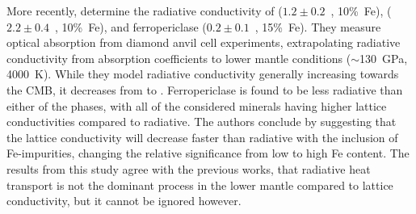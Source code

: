 More recently, \citet{Lobanov2017} determine the radiative conductivity of \ppvs ($1.2\pm0.2$~\wmk, 10\%~Fe), \bdgs ($2.2\pm0.4$~\wmk, 10\%~Fe), and ferropericlase ($0.2\pm0.1$~\wmk, 15\%~Fe). They measure optical absorption from diamond anvil cell experiments, extrapolating radiative conductivity from absorption coefficients to lower mantle conditions ($\sim$130~GPa, 4000~K). While they model radiative conductivity generally increasing towards the CMB, it decreases from \bdgs to \ppv. Ferropericlase is found to be less radiative than either of the \mgfesios phases, with all of the considered minerals having higher lattice conductivities compared to radiative. The authors conclude by suggesting that the lattice conductivity will decrease faster than radiative with the inclusion of Fe-impurities, changing the relative significance from low to high Fe content. The results from this study agree with the previous works, that radiative heat transport is not the dominant process in the lower mantle compared to lattice conductivity, but it cannot be ignored however.

